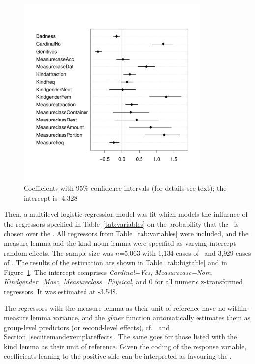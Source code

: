 \begin{figure}[hb!]
  \centering
  \includegraphics[width=0.85\textwidth]{../R/output/corpus_fixeffs}
  \caption{Coefficients with 95\% confidence intervals (for details see text); the intercept is -4.328}
  \label{fig:fixeffs}
\end{figure}

Then, a multilevel logistic regression model was fit which models the influence of the regressors specified in Table~\ref{tab:variables} on the probability that the \PGCa\ is chosen over the \NACa.
All regressors from Table~\ref{tab:variables} were included, and the measure lemma and the kind noun lemma were specified as varying-intercept random effects.
The sample size was \textit{n=}5,063 with 1,134 cases of \PGCa\ and 3,929 cases of \NACa.
The results of the estimation are shown in Table~\ref{tab:bigtable} and in Figure~\ref{fig:fixeffs}.
The intercept comprises \textit{Cardinal=Yes}, \textit{Measurecase=Nom}, \textit{Kindgender=Masc}, \textit{Measureclass=Physical}, and 0 for all numeric z-transformed regressors.
It was estimated at -3.548.

The regressors with the measure lemma as their unit of reference have no within-measure lemma variance, and the \textit{glmer} function automatically estimates them as group-level predictors (or second-level effects), cf.\ \citet[265--269,302--304]{GelmanHill2006} and Section~\ref{sec:itemandexemplareffects}.
The same goes for those listed with the kind lemma as their unit of reference.
Given the coding of the response variable, coefficients leaning to the positive side can be interpreted as favouring the \PGCa.

